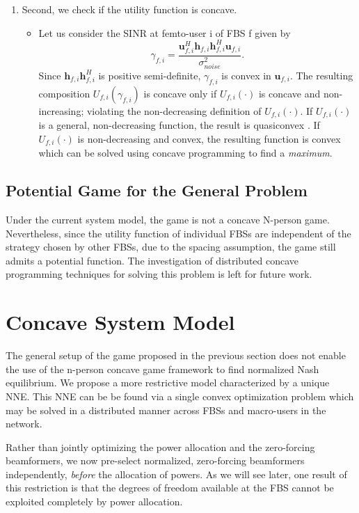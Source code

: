 \documentclass[12pt,a4paper]{report}
\begin{document}
\begin{enumerate}
\item Second, we check if the utility function is concave.
\begin{itemize}
\item 
Let us consider the SINR at femto-user i of FBS f given by
	\begin{equation*}\label{zf_snr}
	\gamma_{f,i} = 
	\frac{\mathbf{u}^H_{f,i}\mathbf{h}_{f,i}\mathbf{h}^H_{f,i}\mathbf{u}_{f,i}}
	{\sigma^2_{noise}  
	}.
	\end{equation*}
	Since
	 $\mathbf{h}_{f,i}\mathbf{h}^H_{f,i}$ is positive semi-definite, $\gamma_{f,i}$ is convex in ${\mathbf{u}_{f,i}}$. 
	 The resulting composition $U_{f,i}(\gamma_{f,i}) $ is concave only if $U_{f,i}(\cdot) $ is concave and non-increasing; violating the non-decreasing definition of $U_{f,i}(\cdot) $.
If $U_{f,i}(\cdot) $ is a general, non-decreasing function, the result is quasiconvex \cite[p.~102]{BoV:04}. If $U_{f,i}(\cdot) $ is  non-decreasing and convex, the resulting
   function is convex which can be solved using concave programming to find a \emph{maximum}.
\end{itemize}

\end{enumerate}

\subsection{Potential Game for the General Problem}
Under the current system model, the game is not a concave N-person game. Nevertheless, since the utility function of individual FBSs are independent of the strategy chosen by other FBSs, due to the spacing assumption, the game still admits a potential function. The investigation of distributed concave programming techniques for solving this problem is left for future work. 

\section{Concave System Model}\label{conmodel}

The general setup of the game proposed in the previous section does not enable the use of the n-person concave game framework to find normalized Nash equilibrium. We propose a more restrictive model characterized by a unique NNE. This NNE can be be found via a single convex optimization problem which may be solved in a distributed manner across FBSs and macro-users in the network.
\par
Rather than jointly optimizing the power allocation and the zero-forcing beamformers, we now pre-select normalized, zero-forcing beamformers independently, \emph{before} the allocation of powers.
As we will see later, one result of this restriction is that the degrees of freedom available at the FBS cannot be exploited completely by power allocation. 
\end{document}
